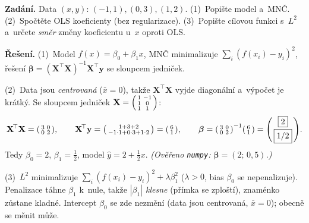 \begin{priklad}
\par
\textbf{Zadání.} Data $(x,y)$: $(-1,1),(0,3),(1,2)$. (1)~Popište model a~MNČ. (2)~Spočtěte OLS koeficienty (bez regularizace). (3)~Popište cílovou funkci s~$L^2$ a~určete \emph{směr} změny koeficientu u~$x$ oproti OLS.

\smallskip
\textbf{Řešení.} (1)~Model $f(x)=\beta_0+\beta_1 x$, MNČ minimalizuje $\sum_i(f(x_i)-y_i)^2$, řešení $\boldsymbol\beta=(\mathbf{X}^{\!\top}\mathbf{X})^{-1}\mathbf{X}^{\!\top}\mathbf{y}$ se sloupcem jedniček.

(2)~Data jsou \emph{centrovaná} ($\bar x=0$), takže $\mathbf{X}^{\!\top}\mathbf{X}$ vyjde diagonální a~výpočet je krátký. Se sloupcem jedniček $\mathbf{X}=\begin{psmallmatrix}1&-1\\1&0\\1&1\end{psmallmatrix}$:
\[ \mathbf{X}^{\!\top}\mathbf{X}=\begin{psmallmatrix}3&0\\0&2\end{psmallmatrix},\qquad \mathbf{X}^{\!\top}\mathbf{y}=\begin{psmallmatrix}1+3+2\\-1\cdot1+0\cdot3+1\cdot2\end{psmallmatrix}=\begin{psmallmatrix}6\\1\end{psmallmatrix},\qquad \boldsymbol\beta=\begin{psmallmatrix}3&0\\0&2\end{psmallmatrix}^{-1}\begin{psmallmatrix}6\\1\end{psmallmatrix}=\begin{psmallmatrix}\boxed{2}\\[1pt]\boxed{1/2}\end{psmallmatrix}. \]
Tedy $\beta_0=2$, $\beta_1=\tfrac12$, model $\hat y=2+\tfrac12 x$. \emph{(Ověřeno \texttt{numpy}: $\boldsymbol\beta=(2;\,0{,}5)$.)}

(3)~$L^2$ minimalizuje $\sum_i(f(x_i)-y_i)^2+\lambda\beta_1^2$ ($\lambda>0$, bias $\beta_0$ se nepenalizuje). Penalizace táhne $\beta_1$ k~nule, takže \emph{$|\beta_1|$ klesne} (přímka se zploští), znaménko zůstane kladné. Intercept $\beta_0$ se zde nezmění (data jsou centrovaná, $\bar x=0$); obecně se měnit může.
\end{priklad}

